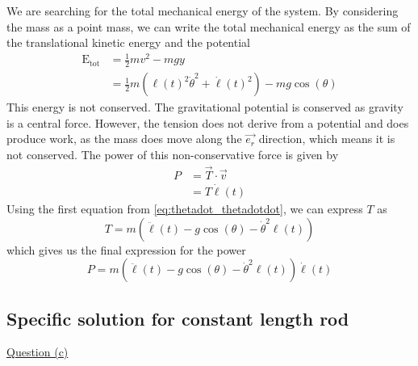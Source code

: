 We are searching for the total mechanical energy of the system. By considering the mass as a point mass, we can write the total mechanical energy as the sum of the translational kinetic energy and the potential
\begin{equation}
    \begin{aligned}
        \mathrm{E_{tot}} &= \frac{1}{2}mv^2 - mgy \\
        &= \frac{1}{2}m(\ell(t)^2 \dot\theta^2 + \dot\ell(t)^2) - mg\cos(\theta)
    \end{aligned}
\end{equation}
This energy is not conserved. The gravitational potential is conserved as gravity is a central force. However, the tension does not derive from a potential and does produce work, as the mass does move along the \(\vec{e_r}\) direction, which means it is not conserved. The power of this non-conservative force is given by
\begin{equation}
    \begin{aligned}
        P &= \vec{T} \cdot \vec{v} \\
        &= T \dot\ell(t)
    \end{aligned}
\end{equation}
Using the first equation from \autoref{eq:thetadot_thetadotdot}, we can express \(T\) as
\begin{equation}
    T = m(\ddot\ell(t) - g\cos(\theta) - \dot\theta^2 \ell(t))
\end{equation}
which gives us the final expression for the power
\begin{equation}
    P = m(\ddot\ell(t) - g\cos(\theta) - \dot\theta^2 \ell(t)) \dot\ell(t)
\end{equation}

\subsection{Specific solution for constant length rod}
\underline{Question (c)}

